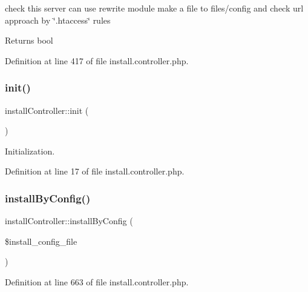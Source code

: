 check this server can use rewrite module make a file to files/config and check url approach by \char`\"{}.\+htaccess\char`\"{} rules

\begin{DoxyReturn}{Returns}
bool 
\end{DoxyReturn}


Definition at line 417 of file install.\+controller.\+php.

\hypertarget{classinstallController_a99641d12063ae41f5a787ac159853c83}{}\label{classinstallController_a99641d12063ae41f5a787ac159853c83} 
\subsubsection{\texorpdfstring{init()}{init()}}
{\footnotesize\ttfamily install\+Controller\+::init (\begin{DoxyParamCaption}{ }\end{DoxyParamCaption})}



Initialization. 



Definition at line 17 of file install.\+controller.\+php.

\hypertarget{classinstallController_a4ec44b3090b73660ba018945c2ffa239}{}\label{classinstallController_a4ec44b3090b73660ba018945c2ffa239} 
\subsubsection{\texorpdfstring{install\+By\+Config()}{installByConfig()}}
{\footnotesize\ttfamily install\+Controller\+::install\+By\+Config (\begin{DoxyParamCaption}\item[{}]{\$install\+\_\+config\+\_\+file }\end{DoxyParamCaption})}



Definition at line 663 of file install.\+controller.\+php.

\hypertarget{classinstallController_ad7919cd4745794ee4f57db53e8105190}{}\label{classinstallController_ad7919cd4745794ee4f57db53e8105190} 
